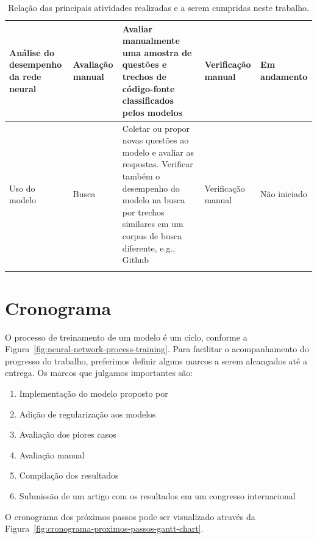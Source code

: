 {\begin{longtable}{ p{8em} p{8em} p{10em} p{8em} p{6em} }
Análise do desempenho da rede neural & Avaliação manual & Avaliar manualmente uma amostra de questões e trechos de código-fonte classificados pelos modelos & Verificação manual & Em andamento \\
\hline

Uso do modelo & Busca & Coletar ou propor novas questões ao modelo e avaliar as respostas. Verificar também o desempenho do modelo na busca por trechos similares em um corpus de busca diferente, e.g., Github & Verificação manual & Não iniciado \\
\hline

 
\caption{Relação das principais atividades realizadas e a serem cumpridas neste trabalho.}
\label{table:etapas-processo-treinamento}
\end{longtable}}


\section{Cronograma}

O processo de treinamento de um modelo é um ciclo, conforme a Figura~\ref{fig:neural-network-process-training}. Para facilitar o acompanhamento do progresso do trabalho, preferimos definir alguns marcos a serem alcançados até a entrega. Os marcos que julgamos importantes são:

\begin{enumerate}
\item Implementação do modelo proposto por \cite{cambronero-deep-learning-code-search:2019}

\item Adição de regularização aos modelos

\item Avaliação dos piores casos

\item Avaliação manual

\item Compilação dos resultados

\item Submissão de um artigo com os resultados em um congresso internacional

\end{enumerate}

O cronograma dos próximos passos pode ser visualizado através da Figura~\ref{fig:cronograma-proximos-passos-gantt-chart}.

